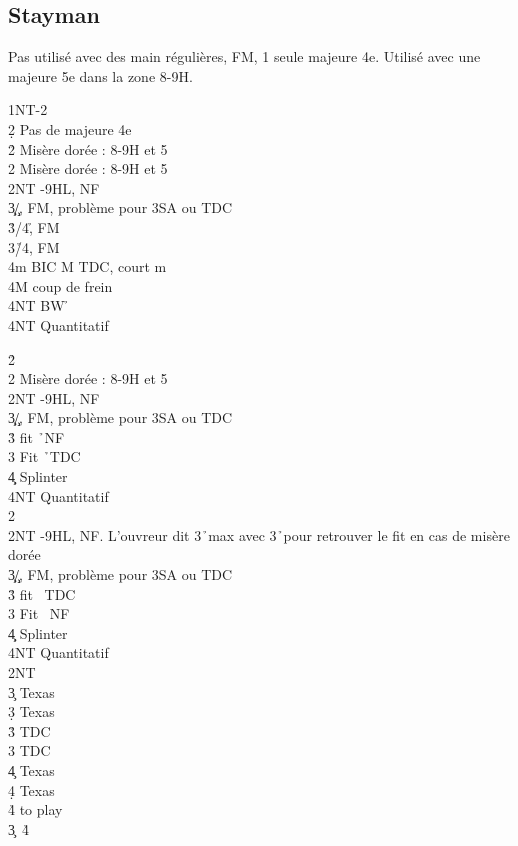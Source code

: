 \documentclass[a4paper]{article}
\begin{document}
\subsection{Stayman}

Pas utilisé avec des main régulières, FM, 1 seule majeure 4e.
Utilisé avec une majeure 5e dans la zone 8-9H.

\begin{bidtable}
1NT-2\c\\
2\d \> Pas de majeure 4e\+\\
2\h \> Misère dorée : 8-9H et 5\h \\
2\s \> Misère dorée : 8-9H et 5\s \\
2NT -9HL, NF\\
3\c\d {}\c /\d , FM, problème pour 3SA ou TDC\\
3\h {}\s /4\h , FM\\
3\s {}\h /4\s , FM\\
4m \> BIC M TDC, court m\+\\
4M \> coup de frein\\
4NT \> BW \h \-\\
4NT \> Quantitatif\-
\end{bidtable}

\begin{bidtable}
2\h\+\\
2\s \> Misère dorée : 8-9H et 5\s \\
2NT -9HL, NF\\
3\c\d {}\c /\d , FM, problème pour 3SA ou TDC\\
3\h \> fit \h\ NF\\
3\s \> Fit \h\ TDC\\
4\c\d \> Splinter\\
4NT \> Quantitatif\-\\
2\s\+\\
2NT -9HL, NF. L'ouvreur dit 3\h\ max avec 3\h\ pour retrouver le fit en cas de misère dorée\\
3\c\d {}\c /\d , FM, problème pour 3SA ou TDC\\
3\h \> fit \s\ TDC\\
3\s \> Fit \s\ NF\\
4\c\d \> Splinter\\
4NT \> Quantitatif\-\\
2NT\+\\
3\c \> Texas \h \\
3\d \> Texas \s \\
3\h \> TDC\\
3\s \> TDC\\
4\c \> Texas \h \\
4\d \> Texas \s \\
4\h\s \> to play\-\\
3\c {}\s\ 4\h 
\end{bidtable}
\end{document}
